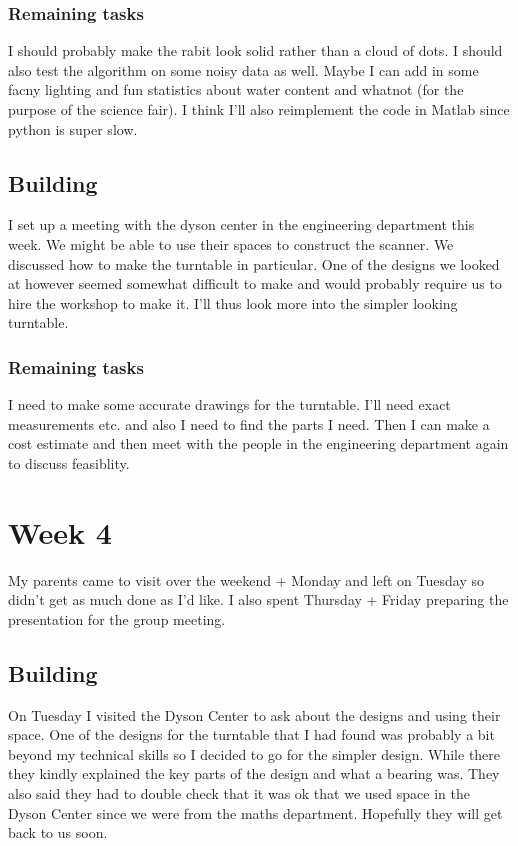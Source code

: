 \documentclass[a4paper]{article}
\begin{document}
\subsubsection{Remaining tasks}
I should probably make the rabit look solid rather than a cloud of dots. I should also test the algorithm on some noisy data as well.
Maybe I can add in some facny lighting and fun statistics about water content and whatnot (for the purpose of the science fair).
I think I'll also reimplement the code in Matlab since python is super slow.

\subsection{Building}
I set up a meeting with the dyson center in the engineering department this week. We might be able to use their spaces to construct the scanner.
We discussed how to make the turntable in particular. One of the designs we looked at however seemed somewhat difficult to make and would probably require us to hire the workshop to make it. 
I'll thus look more into the simpler looking turntable. 

\subsubsection{Remaining tasks}
I need to make some accurate drawings for the turntable.
I'll need exact measurements etc. and also I need to find the parts I need. Then I can make a cost estimate and then meet with the people in the engineering department again to discuss feasiblity.

\section{Week 4}

My parents came to visit over the weekend + Monday and left on Tuesday so didn't get as much done as I'd like. I also spent Thursday + Friday preparing the presentation for the group meeting.

\subsection{Building}
On Tuesday I visited the Dyson Center to ask about the designs and using their space.
One of the designs for the turntable that I had found was probably a bit beyond my technical skills so I decided to go for the simpler design.
While there they kindly explained the key parts of the design and what a bearing was.
They also said they had to double check that it was ok that we used space in the Dyson Center since we were from the maths department. Hopefully they will get back to us soon.
\end{document}
